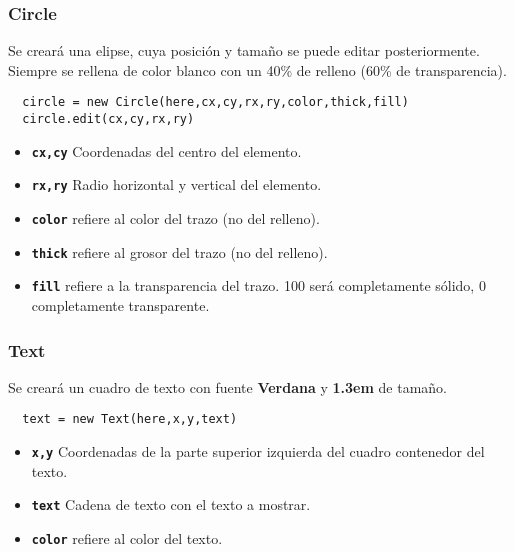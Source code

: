 
\subsubsection{Circle} %
\label{ssub:circle}

Se creará una elipse, cuya posición y tamaño se puede editar posteriormente. Siempre se rellena de color blanco con un 40\% de relleno (60\% de transparencia).

\begin{verbatim}
  circle = new Circle(here,cx,cy,rx,ry,color,thick,fill)
  circle.edit(cx,cy,rx,ry)
\end{verbatim}

\begin{itemize}
  \item \textbf{\texttt{cx,cy}} Coordenadas del centro del elemento.
  \item \textbf{\texttt{rx,ry}} Radio horizontal y vertical del elemento.
  \item \textbf{\texttt{color}} refiere al color del trazo (no del relleno).
  \item \textbf{\texttt{thick}} refiere al grosor del trazo (no del relleno).
  \item \textbf{\texttt{fill}} refiere a la transparencia del trazo. 100 será completamente sólido, 0 completamente transparente.
\end{itemize}


\subsubsection{Text} %
\label{ssub:text}

Se creará un cuadro de texto con fuente \textbf{Verdana} y \textbf{1.3em} de tamaño.

\begin{verbatim}
  text = new Text(here,x,y,text)
\end{verbatim}

\begin{itemize}
  \item \textbf{\texttt{x,y}} Coordenadas de la parte superior izquierda del cuadro contenedor del texto.
  \item \textbf{\texttt{text}} Cadena de texto con el texto a mostrar.
  \item \textbf{\texttt{color}} refiere al color del texto.
\end{itemize}




